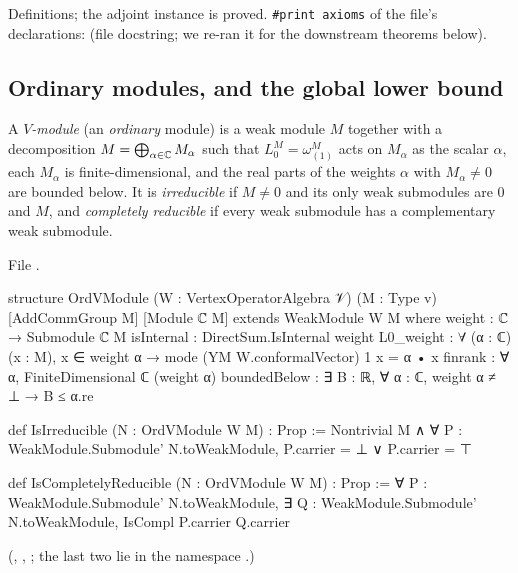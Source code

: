 \begin{status}
Definitions; the adjoint instance is proved. \texttt{\#print axioms} of the file's declarations:
 (file docstring; we re-ran it for the downstream
theorems below).
\end{status}

\subsection{Ordinary modules, and the global lower bound}

\begin{definition}\label{l12:def:ordmodule}
A \emph{$V$-module} (an \emph{ordinary} module) is a weak module $M$ together with a decomposition
$M = \bigoplus_{\alpha\in{\mathbb{C}}}M_\alpha$ such that $L^M_0 = \omega^M_{(1)}$ acts on $M_\alpha$ as the scalar $\alpha$, each
$M_\alpha$ is finite-dimensional, and the real parts of the weights $\alpha$ with $M_\alpha\neq0$ are bounded below. It is
\emph{irreducible} if $M\neq0$ and its only weak submodules are $0$ and $M$, and \emph{completely reducible} if every weak
submodule has a complementary weak submodule.
\end{definition}
\noindent File .
\begin{leancode}
structure OrdVModule (W : VertexOperatorAlgebra 𝒱) (M : Type v)
    [AddCommGroup M] [Module ℂ M] extends WeakModule W M where
  weight : ℂ → Submodule ℂ M
  isInternal : DirectSum.IsInternal weight
  L0_weight : ∀ (α : ℂ) (x : M), x ∈ weight α → mode (YM W.conformalVector) 1 x = α • x
  finrank : ∀ α, FiniteDimensional ℂ (weight α)
  boundedBelow : ∃ B : ℝ, ∀ α : ℂ, weight α ≠ ⊥ → B ≤ α.re

def IsIrreducible (N : OrdVModule W M) : Prop :=
  Nontrivial M ∧ ∀ P : WeakModule.Submodule' N.toWeakModule, P.carrier = ⊥ ∨ P.carrier = ⊤

def IsCompletelyReducible (N : OrdVModule W M) : Prop :=
  ∀ P : WeakModule.Submodule' N.toWeakModule,
    ∃ Q : WeakModule.Submodule' N.toWeakModule, IsCompl P.carrier Q.carrier
\end{leancode}
(, , ; the last two lie in
the namespace .)


